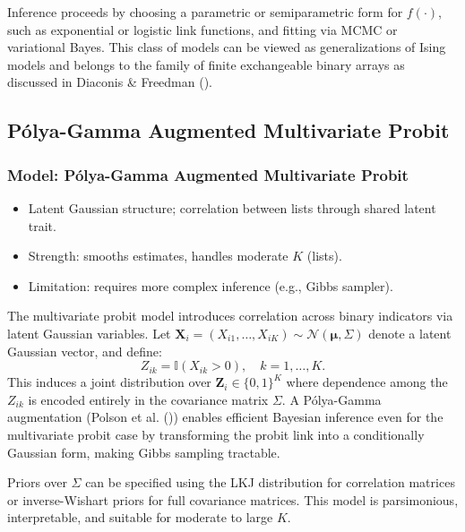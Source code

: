 \documentclass[
  12pt,
]{article}
\providecommand{\tightlist}{%
  \setlength{\itemsep}{0pt}\setlength{\parskip}{0pt}}\usepackage{longtable,booktabs,array}
\theoremstyle{plain}
\theoremstyle{definition}
\begin{document}
Inference proceeds by choosing a parametric or semiparametric form for
\(f(\cdot)\), such as exponential or logistic link functions, and
fitting via MCMC or variational Bayes. This class of models can be
viewed as generalizations of Ising models and belongs to the family of
finite exchangeable binary arrays as discussed in Diaconis \& Freedman
().

\subsection{Pólya-Gamma Augmented Multivariate
Probit}\label{puxf3lya-gamma-augmented-multivariate-probit}

\subsubsection{Model: Pólya-Gamma Augmented Multivariate
Probit}\label{model-puxf3lya-gamma-augmented-multivariate-probit}

\begin{itemize}
\tightlist
\item
  Latent Gaussian structure; correlation between lists through shared
  latent trait.
\item
  Strength: smooths estimates, handles moderate \(K\) (lists).
\item
  Limitation: requires more complex inference (e.g., Gibbs sampler).
\end{itemize}

The multivariate probit model introduces correlation across binary
indicators via latent Gaussian variables. Let
\(\mathbf{X}_i = (X_{i1}, \ldots, X_{iK}) \sim \mathcal{N}(\boldsymbol{\mu}, \Sigma)\)
denote a latent Gaussian vector, and define: \[
Z_{ik} = \mathbb{I}(X_{ik} > 0), \quad k = 1, \ldots, K.
\] This induces a joint distribution over \(\mathbf{Z}_i \in \{0,1\}^K\)
where dependence among the \(Z_{ik}\) is encoded entirely in the
covariance matrix \(\Sigma\). A Pólya-Gamma augmentation (Polson et al.
()) enables efficient Bayesian
inference even for the multivariate probit case by transforming the
probit link into a conditionally Gaussian form, making Gibbs sampling
tractable.

Priors over \(\Sigma\) can be specified using the LKJ distribution for
correlation matrices or inverse-Wishart priors for full covariance
matrices. This model is parsimonious, interpretable, and suitable for
moderate to large \(K\).
\end{document}
